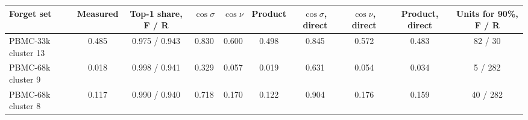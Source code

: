 \begin{tabular}{lccccccccc}
\toprule
Forget set & Measured & Top-1 share, F / R & $\cos\sigma$ & $\cos\nu$ & Product & $\cos\sigma$, direct & $\cos\nu$, direct & Product, direct & Units for 90\%, F / R \\
\midrule
PBMC-33k cluster 13 & 0.485 & 0.975 / 0.943 & 0.830 & 0.600 & 0.498 & 0.845 & 0.572 & 0.483 & 82 / 30 \\
PBMC-68k cluster 9 & 0.018 & 0.998 / 0.941 & 0.329 & 0.057 & 0.019 & 0.631 & 0.054 & 0.034 & 5 / 282 \\
PBMC-68k cluster 8 & 0.117 & 0.990 / 0.940 & 0.718 & 0.170 & 0.122 & 0.904 & 0.176 & 0.159 & 40 / 282 \\
\bottomrule
\end{tabular}
